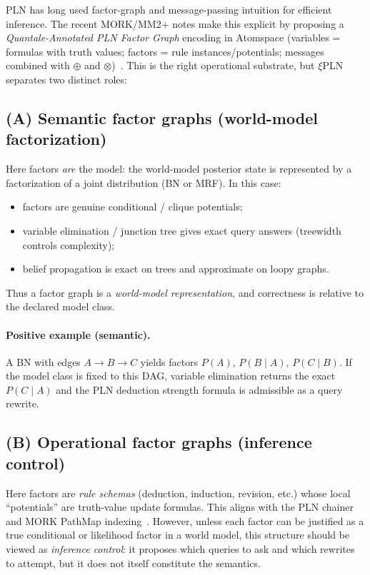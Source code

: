\documentclass[]{article}
\newcommand{\xiPLN}{\texorpdfstring{$\xi$}{xi}\textup{PLN}}
\begin{document}
PLN has long used factor-graph and message-passing intuition for efficient inference.
The recent MORK/MM2+ notes make this explicit by proposing a \emph{Quantale-Annotated PLN
Factor Graph} encoding in Atomspace (variables = formulas with truth values; factors = rule
instances/potentials; messages combined with $\oplus$ and $\otimes$)~\cite{Goertzel2025PLNFactorGraphMORK,Goertzel2025MOSESMORK}.
This is the right operational substrate, but \xiPLN{} separates two distinct roles:

\subsection{(A) Semantic factor graphs (world-model factorization)}

Here factors \emph{are} the model: the world-model posterior state is represented by a
factorization of a joint distribution (BN or MRF).  In this case:
\begin{itemize}
\item factors are genuine conditional / clique potentials;
\item variable elimination / junction tree gives exact query answers
  (treewidth controls complexity);
\item belief propagation is exact on trees and approximate on loopy graphs.
\end{itemize}
Thus a factor graph is a \emph{world-model representation}, and correctness is relative
to the declared model class.

\paragraph{Positive example (semantic).}
A BN with edges $A\to B\to C$ yields factors $P(A)$, $P(B\mid A)$, $P(C\mid B)$.
If the model class is fixed to this DAG, variable elimination returns the exact
$P(C\mid A)$ and the PLN deduction strength formula is admissible as a query rewrite.

\subsection{(B) Operational factor graphs (inference control)}

Here factors are \emph{rule schemas} (deduction, induction, revision, etc.) whose local
``potentials'' are truth-value update formulas.  This aligns with the PLN chainer
and MORK PathMap indexing~\cite{Goertzel2025PLNFactorGraphMORK,Goertzel2025MORKMiner}.
However, unless each factor can be justified as a true conditional or likelihood
factor in a world model, this structure should be viewed as \emph{inference control}:
it proposes which queries to ask and which rewrites to attempt, but it does not itself
constitute the semantics.
\end{document}
